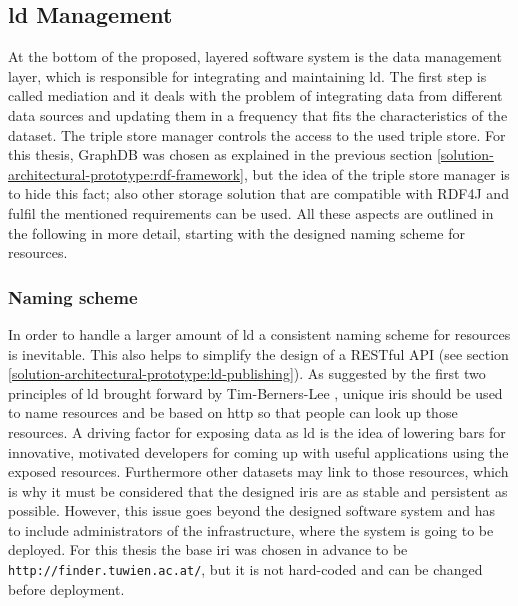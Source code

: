 \documentclass[draft,final]{vutinfth} %
\begin{document}
\subsection{\gls{ld} Management}
\label{solution-architectural-prototype:ld-management}
At the bottom of the proposed, layered software system is the data management layer, which is responsible for integrating and maintaining \gls{ld}. The first step is called mediation and it deals with the problem of integrating data from different data sources and updating them in a frequency that fits the characteristics of the dataset. The triple store manager controls the access to the used triple store. For this thesis, GraphDB was chosen as explained in the previous section \ref{solution-architectural-prototype:rdf-framework}, but the idea of the triple store manager is to hide this fact; also other storage solution that are compatible with RDF4J and fulfil the mentioned requirements can be used. All these aspects are outlined in the following in more detail, starting with the designed naming scheme for resources.


\subsubsection{Naming scheme}
In order to handle a larger amount of \gls{ld} a consistent naming scheme for resources is inevitable. This also helps to simplify the design of a RESTful API (see section \ref{solution-architectural-prototype:ld-publishing}). As suggested by the first two principles of \gls{ld} brought forward by Tim-Berners-Lee \cite{berners-lee_linked_2009}, unique \gls{iri}s should be used to name resources and be based on \gls{http} so that people can look up those resources. A driving factor for exposing data as \gls{ld} is the idea of lowering bars for innovative, motivated developers for coming up with useful applications using the exposed resources. Furthermore other datasets may link to those resources, which is why it must be considered that the designed \gls{iri}s are as stable and persistent as possible. However, this issue goes beyond the designed software system and has to include administrators of the infrastructure, where the system is going to be deployed. For this thesis the base \gls{iri} was chosen in advance to be \texttt{http://finder.tuwien.ac.at/}, but it is not hard-coded and can be changed before deployment.
\end{document}
